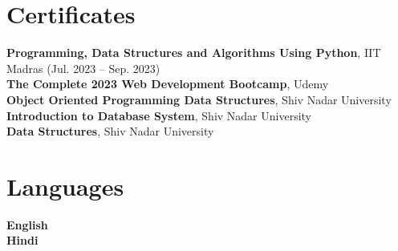 \documentclass[letterpaper,11pt]{article}
\begin{document}
\section{Certificates}
 \begin{itemize}[leftmargin=0.15in, label={}]
    \small{\item{
     \textbf{Programming, Data Structures and Algorithms Using Python}{, IIT Madras (Jul. 2023 -- Sep. 2023)} \\
     \textbf{The Complete 2023 Web Development Bootcamp}{, Udemy} \\
     \textbf{Object Oriented Programming Data Structures}{, Shiv Nadar University} \\
      \textbf{Introduction to Database System}{, Shiv Nadar University} \\
      \textbf{Data Structures}{, Shiv Nadar University} \\
    }}
 \end{itemize}


\section{Languages}
 \begin{itemize}[leftmargin=0.15in, label={}]
    \small{\item{
     \textbf{English} \\
     \textbf{Hindi} \\
    }}
 \end{itemize}

\end{document}
